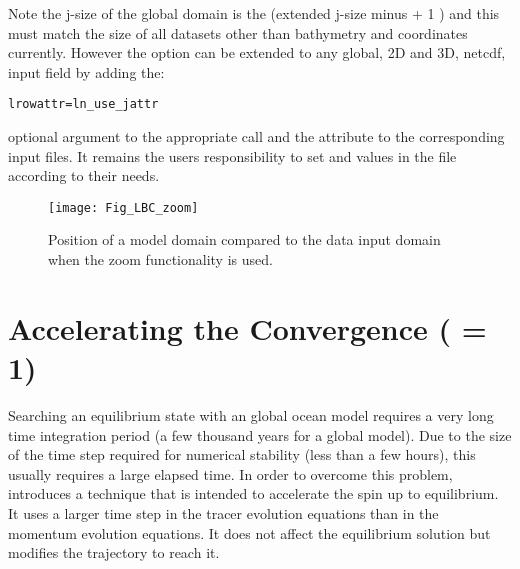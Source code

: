 \documentclass[NEMO_book]{subfiles}
\begin{document}
\noindent Note the j-size of the global domain is the (extended j-size minus
 + 1 ) and this must match the size of all datasets other than
bathymetry and coordinates currently. However the option can be extended to any global, 2D
and 3D, netcdf, input field by adding the:
\vspace{-10pt}
\begin{alltt}
\tiny
\begin{verbatim}
lrowattr=ln_use_jattr
\end{verbatim}
\end{alltt}
optional argument to the appropriate  call and the  attribute to the corresponding input files. It remains the users responsibility to set  and  values in the  file according to their needs.

\begin{figure}[!ht] 	  \begin{center}
\texttt{[image: Fig\_LBC\_zoom]}
\caption{	\label{Fig_LBC_zoom}
Position of a model domain compared to the data input domain when the zoom functionality is used.}
\end{center}   \end{figure}


\section{Accelerating the Convergence ( = 1)}
\label{MISC_acc}

Searching an equilibrium state with an global ocean model requires a very long time 
integration period (a few thousand years for a global model). Due to the size of 
the time step required for numerical stability (less than a few hours), 
this usually requires a large elapsed time. In order to overcome this problem, 
\citet{Bryan1984} introduces a technique that is intended to accelerate 
the spin up to equilibrium. It uses a larger time step in 
the tracer evolution equations than in the momentum evolution 
equations. It does not affect the equilibrium solution but modifies the 
trajectory to reach it.
\end{document}
